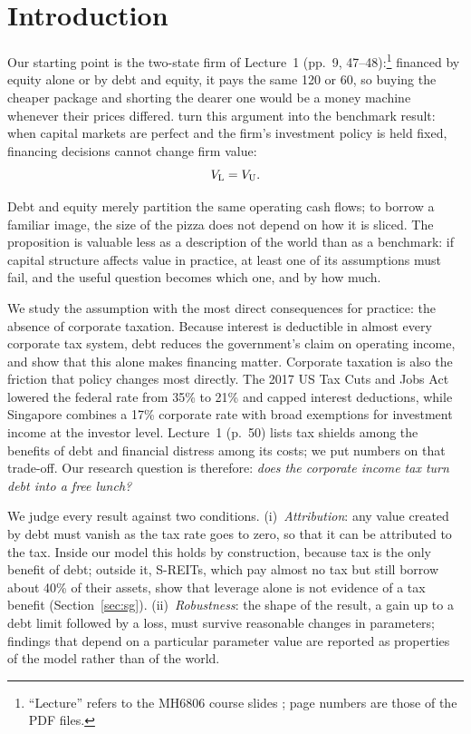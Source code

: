 \section{Introduction}\label{sec:intro}

Our starting point is the two-state firm of Lecture~1 (pp.~9, 47--48):\footnote{``Lecture'' refers to the MH6806 course slides \citep{vaidya2026}; page numbers are those of the PDF files.} financed by equity alone or by debt and equity, it pays the same 120 or 60, so buying the cheaper package and shorting the dearer one would be a money machine whenever their prices differed. \citet{mm1958} turn this argument into the benchmark result: when capital markets are perfect and the firm's investment policy is held fixed, financing decisions cannot change firm value:
\begin{equation}
V_{\mathrm{L}} = V_{\mathrm{U}}. \label{eq:mm}
\end{equation}

Debt and equity merely partition the same operating cash flows; to borrow a familiar image, the size of the pizza does not depend on how it is sliced. The proposition is valuable less as a description of the world than as a benchmark: if capital structure affects value in practice, at least one of its assumptions must fail, and the useful question becomes which one, and by how much.

We study the assumption with the most direct consequences for practice: the absence of corporate taxation. Because interest is deductible in almost every corporate tax system, debt reduces the government's claim on operating income, and \citet{mm1963} show that this alone makes financing matter. Corporate taxation is also the friction that policy changes most directly. The 2017 US Tax Cuts and Jobs Act lowered the federal rate from 35\% to 21\% and capped interest deductions, while Singapore combines a 17\% corporate rate with broad exemptions for investment income at the investor level. Lecture~1 (p.~50) lists tax shields among the benefits of debt and financial distress among its costs; we put numbers on that trade-off. Our research question is therefore: \textit{does the corporate income tax turn debt into a free lunch?}

We judge every result against two conditions. (i)~\textit{Attribution}: any value created by debt must vanish as the tax rate goes to zero, so that it can be attributed to the tax. Inside our model this holds by construction, because tax is the only benefit of debt; outside it, S-REITs, which pay almost no tax but still borrow about 40\% of their assets, show that leverage alone is not evidence of a tax benefit (Section~\ref{sec:sg}). (ii)~\textit{Robustness}: the shape of the result, a gain up to a debt limit followed by a loss, must survive reasonable changes in parameters; findings that depend on a particular parameter value are reported as properties of the model rather than of the world.

